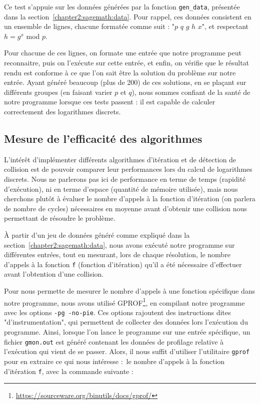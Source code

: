       Ce test s'appuie sur les données générées par la fonction \lstinline{gen_data}, présentée dans la section~\ref{chapter2:sagemath:data}. Pour rappel, ces données consistent en un ensemble de lignes, chacune formatée comme suit : "$p$ $q$ $g$ $h$ $x$", et respectant $h = g^x$ mod $p$.

      Pour chacune de ces lignes, on formate une entrée que notre programme peut reconnaitre, puis on l'exécute sur cette entrée, et enfin, on vérifie que le résultat rendu est conforme à ce que l'on sait être la solution du problème sur notre entrée.
      Ayant généré beaucoup (plus de 200) de ces solutions, en se plaçant sur différents groupes (en faisant varier $p$ et $q$), nous sommes confiant de la santé de notre programme lorsque ces tests passent : il est capable de calculer correctement des logarithmes discrets.


      \subsection{Mesure de l'efficacité des algorithmes}
      L'intérêt d'implémenter différents algorithmes d'itération et de détection de collision est de pouvoir comparer leur performances lors du calcul de logarithmes discrets. Nous ne parlerons pas ici de performance en terme de temps (rapidité d'exécution), ni en terme d'espace (quantité de mémoire utilisée), mais nous cherchons plutôt à évaluer le nombre d'appels à la fonction d'itération (on parlera de nombre de cycles) nécessaires en moyenne avant d'obtenir une collision nous permettant de résoudre le problème.

      À partir d'un jeu de données généré comme expliqué dans la section~\ref{chapter2:sagemath:data}, nous avons exécuté notre programme sur différentes entrées, tout en mesurant, lors de chaque résolution, le nombre d'appels à la fonction \lstinline{f} (fonction d'itération) qu'il a été nécessaire d'effectuer avant l'obtention d'une collision.

      Pour nous permette de mesurer le nombre d'appels à une fonction spécifique dans notre programme, nous avons utilisé GPROF\footnote{\url{https://sourceware.org/binutils/docs/gprof/}}, en compilant notre programme avec les options \lstinline{-pg -no-pie}. Ces options rajoutent des instructions dites "d'instrumentation", qui permettent de collecter des données lors l'exécution du programme.
      Ainsi, lorsque l'on lance le programme sur une entrée spécifique, un fichier \lstinline{gmon.out} est généré contenant les données de profilage relative à l'exécution qui vient de se passer. Alors, il nous suffit d'utiliser l'utilitaire \lstinline{gprof} pour en extraire ce qui nous intéresse : le nombre d'appels à la fonction d'itération \lstinline{f}, avec la commande suivante :

